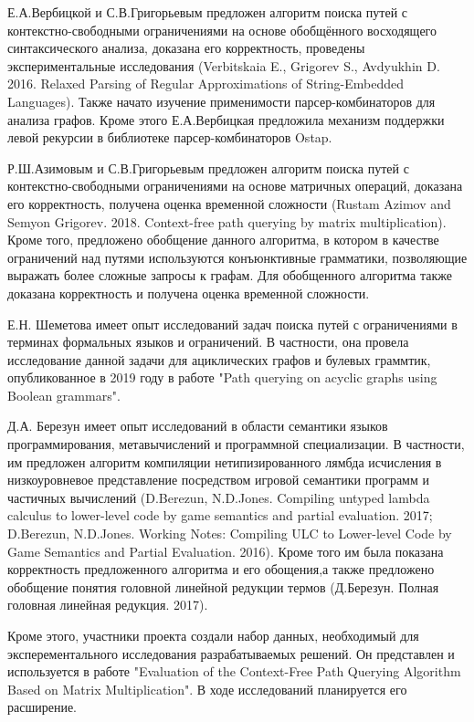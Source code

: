 \documentclass[12pt]{article}  %
\theoremstyle{remark}
\begin{document}
Е.А.Вербицкой и С.В.Григорьевым предложен алгоритм поиска путей с контекстно-свободными ограничениями на основе обобщённого восходящего синтаксического анализа, доказана его корректность, проведены экспериментальные исследования (Verbitskaia E., Grigorev S., Avdyukhin D. 2016. Relaxed Parsing of Regular Approximations of String-Embedded Languages). Также начато изучение применимости парсер-комбинаторов для анализа графов. Кроме этого Е.А.Вербицкая предложила механизм поддержки левой рекурсии в библиотеке парсер-комбинаторов Ostap.

Р.Ш.Азимовым и С.В.Григорьевым предложен алгоритм поиска путей с контекстно-свободными ограничениями на основе матричных операций, доказана его корректность, получена оценка временной сложности (Rustam Azimov and Semyon Grigorev. 2018. Context-free path querying by matrix multiplication). Кроме того, предложено обобщение данного алгоритма, в котором в качестве ограничений над путями используются конъюнктивные грамматики, позволяющие выражать более сложные запросы к графам. Для обобщенного алгоритма также доказана корректность и получена оценка временной сложности.

Е.Н. Шеметова имеет опыт исследований задач поиска путей с ограничениями в терминах формальных языков и ограничений. В частности, она провела исследование данной задачи для ациклических графов и булевых граммтик, опубликованное в 2019 году в работе "Path querying on acyclic graphs using Boolean grammars".

Д.А. Березун имеет опыт исследований в области семантики языков программирования, метавычислений и
программной специализации.
В частности, им предложен алгоритм компиляции нетипизированного лямбда исчисления в низкоуровневое
представление посредством игровой семантики программ и частичных вычислений (D.Berezun, N.D.Jones. Compiling untyped lambda calculus to lower-level code by game semantics and partial evaluation. 2017; D.Berezun, N.D.Jones. Working Notes: Compiling ULC to Lower-level Code by Game Semantics and Partial Evaluation. 2016).
Кроме того им была показана корректность предложенного алгоритма и его обощения,а также предложено обобщение понятия головной линейной редукции термов
(Д.Березун. Полная головная линейная редукция. 2017).

Кроме этого, участники проекта создали набор данных, необходимый для эксперементального исследования разрабатываемых решений. Он представлен и используется в работе "Evaluation of the Context-Free Path Querying Algorithm Based on Matrix Multiplication". В ходе исследований планируется его расширение.
\end{document}
